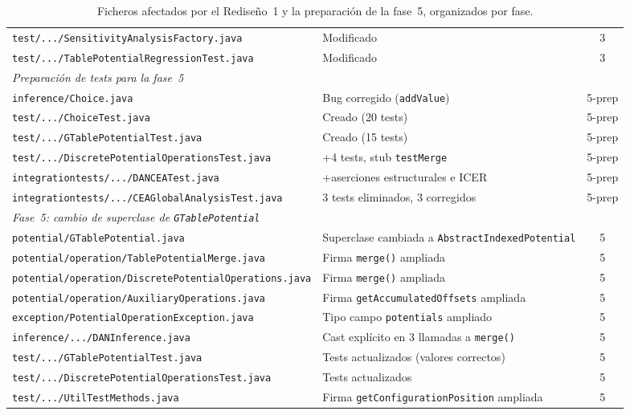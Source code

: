 \documentclass[11pt,a4paper]{article}
\newcommand{\code}[1]{\texttt{#1}}
\begin{document}
\begin{table}[H]
{\begin{tabular}{llc}
\midrule
\code{test/.../SensitivityAnalysisFactory.java} & Modificado & 3 \\
\code{test/.../TablePotentialRegressionTest.java} & Modificado & 3 \\
\midrule
\multicolumn{3}{l}{\emph{Preparación de tests para la fase~5}} \\
\midrule
\code{inference/Choice.java} & Bug corregido (\code{addValue}) & 5-prep \\
\code{test/.../ChoiceTest.java} & Creado (20 tests) & 5-prep \\
\code{test/.../GTablePotentialTest.java} & Creado (15 tests) & 5-prep \\
\code{test/.../DiscretePotentialOperationsTest.java} & +4 tests, stub \code{testMerge} & 5-prep \\
\code{integrationtests/.../DANCEATest.java} & +aserciones estructurales e ICER & 5-prep \\
\code{integrationtests/.../CEAGlobalAnalysisTest.java} & 3 tests eliminados, 3 corregidos & 5-prep \\
\midrule
\multicolumn{3}{l}{\emph{Fase~5: cambio de superclase de \code{GTablePotential}}} \\
\midrule
\code{potential/GTablePotential.java} & Superclase cambiada a \code{AbstractIndexedPotential} & 5 \\
\code{potential/operation/TablePotentialMerge.java} & Firma \code{merge()} ampliada & 5 \\
\code{potential/operation/DiscretePotentialOperations.java} & Firma \code{merge()} ampliada & 5 \\
\code{potential/operation/AuxiliaryOperations.java} & Firma \code{getAccumulatedOffsets} ampliada & 5 \\
\code{exception/PotentialOperationException.java} & Tipo campo \code{potentials} ampliado & 5 \\
\code{inference/.../DANInference.java} & Cast explícito en 3 llamadas a \code{merge()} & 5 \\
\code{test/.../GTablePotentialTest.java} & Tests actualizados (valores correctos) & 5 \\
\code{test/.../DiscretePotentialOperationsTest.java} & Tests actualizados & 5 \\
\code{test/.../UtilTestMethods.java} & Firma \code{getConfigurationPosition} ampliada & 5 \\
\bottomrule
\end{tabular}%
}
\caption{Ficheros afectados por el Rediseño~1 y la preparación de la fase~5, organizados por fase.}
\label{tab:ficheros}
\end{table}
\end{document}
